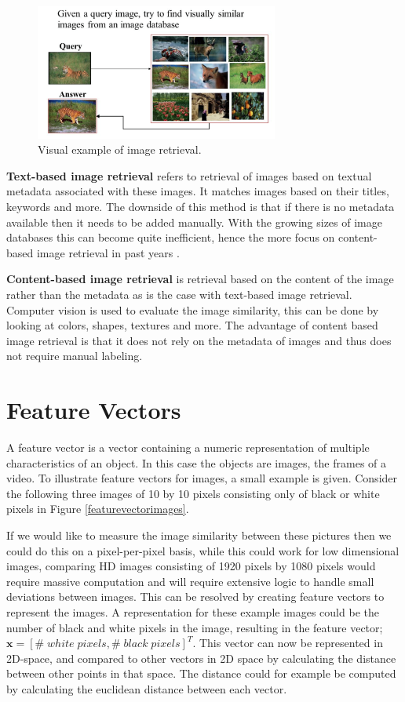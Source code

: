 \documentclass{report}
\begin{document}
\begin{figure}[H]
	\includegraphics[width=8cm]{images/imageretrieval.png}
	\centering
	\caption{Visual example of image retrieval.}
	\label{fig:imageretrieval}
\end{figure}

\textbf{Text-based image retrieval} refers to retrieval of images based on textual metadata associated with these images. It matches images based on their titles, keywords and more. The downside of this method is that if there is no metadata available then it needs to be added manually. With the growing sizes of image databases this can become quite inefficient, hence the more focus on content-based image retrieval in past years \cite{rajam2013survey}.

\textbf{Content-based image retrieval} is retrieval based on the content of the image rather than the metadata as is the case with text-based image retrieval. Computer vision is used to evaluate the image similarity, this can be done by looking at colors, shapes, textures and more. The advantage of content based image retrieval is that it does not rely on the metadata of images and thus does not require manual labeling.

\section{Feature Vectors}
A feature vector is a vector containing a numeric representation of multiple characteristics of an object. In this case the objects are images, the frames of a video. To illustrate feature vectors for images, a small example is given. Consider the following three images of 10 by 10 pixels consisting only of black or white pixels in Figure \ref{featurevectorimages}.

If we would like to measure the image similarity between these pictures then we could do this on a pixel-per-pixel basis, while this could work for low dimensional images, comparing HD images consisting of 1920 pixels by 1080 pixels would require massive computation and will require extensive logic to handle small deviations between images. This can be resolved by creating feature vectors to represent the images. A representation for these example images could be the number of black and white pixels in the image, resulting in the feature vector; $\textbf{x} = [\#\;white\;pixels, \#\;black\;pixels]^T$. This vector can now be represented in 2D-space, and compared to other vectors in 2D space by calculating the distance between other points in that space. The distance could for example be computed by calculating the euclidean distance between each vector.
\end{document}

